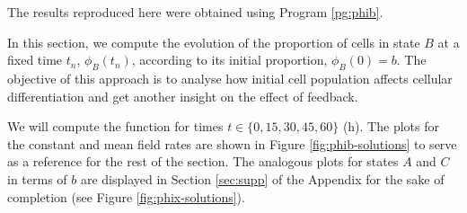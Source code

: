 The results reproduced here were obtained using Program \ref{pg:phib}.

In this section, we compute the evolution of the proportion of cells in state $B$ at a fixed time $t_n$, $\phi_B(t_n)$, according to its initial proportion, $\phi_B(0)=b$. The objective of this approach is to analyse how initial cell population affects cellular differentiation and get another insight on the effect of feedback.

We will compute the function for times $t\in\{0,15,30,45,60\}$ (h). The plots for the constant and  mean field rates are shown in Figure \ref{fig:phib-solutions} to serve as a reference for the rest of the section. The analogous plots for states $A$ and $C$ in terms of $b$ are displayed in Section \ref{sec:supp} of the Appendix for the sake of completion (see Figure \ref{fig:phix-solutions}).

